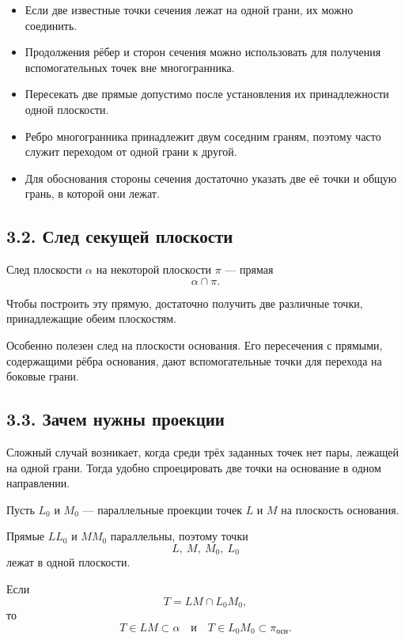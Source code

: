 \documentclass[a4paper,12pt]{article}
\begin{document}
\begin{itemize}
  \item
  Если две известные точки сечения
  лежат на одной грани,
  их можно соединить.

  \item
  Продолжения рёбер и сторон сечения
  можно использовать для получения
  вспомогательных точек вне многогранника.

  \item
  Пересекать две прямые допустимо
  после установления их принадлежности
  одной плоскости.

  \item
  Ребро многогранника принадлежит двум соседним граням,
  поэтому часто служит переходом
  от одной грани к другой.

  \item
  Для обоснования стороны сечения
  достаточно указать две её точки
  и общую грань,
  в которой они лежат.
\end{itemize}

\subsection*{3.2. След секущей плоскости}

След плоскости $\alpha$
на некоторой плоскости $\pi$ --- прямая
\[
\alpha\cap\pi.
\]

Чтобы построить эту прямую,
достаточно получить две различные точки,
принадлежащие обеим плоскостям.

Особенно полезен след
на плоскости основания.
Его пересечения с прямыми,
содержащими рёбра основания,
дают вспомогательные точки
для перехода на боковые грани.

\subsection*{3.3. Зачем нужны проекции}

Сложный случай возникает,
когда среди трёх заданных точек
нет пары,
лежащей на одной грани.
Тогда удобно спроецировать две точки
на основание в одном направлении.

Пусть $L_0$ и $M_0$ ---
параллельные проекции точек $L$ и $M$
на плоскость основания.

Прямые $LL_0$ и $MM_0$ параллельны,
поэтому точки
\[
L,\ M,\ M_0,\ L_0
\]
лежат в одной плоскости.

Если
\[
T=LM\cap L_0M_0,
\]
то
\[
T\in LM\subset\alpha
\quad\text{и}\quad
T\in L_0M_0\subset\pi_{\text{осн}}.
\]
\end{document}
